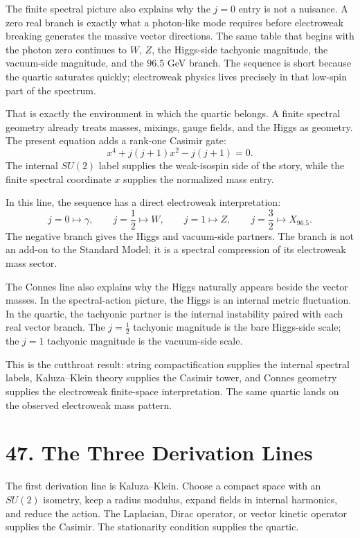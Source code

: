 \documentclass[11pt]{article}
\begin{document}
The finite spectral picture also explains why the \(j=0\) entry is not a nuisance. A zero real branch is exactly what a photon-like mode requires before electroweak breaking generates the massive vector directions. The same table that begins with the photon zero continues to \(W\), \(Z\), the Higgs-side tachyonic magnitude, the vacuum-side magnitude, and the \(96.5\) GeV branch. The sequence is short because the quartic saturates quickly; electroweak physics lives precisely in that low-spin part of the spectrum.

That is exactly the environment in which the quartic belongs. A finite spectral geometry already treats masses, mixings, gauge fields, and the Higgs as geometry. The present equation adds a rank-one Casimir gate:
\[
        x^4+j(j+1)x^2-j(j+1)=0.
\]
The internal \(SU(2)\) label supplies the weak-isospin side of the story, while the finite spectral coordinate \(x\) supplies the normalized mass entry.

In this line, the sequence has a direct electroweak interpretation:
\[
        j=0\mapsto \gamma,\qquad
        j=\frac12\mapsto W,\qquad
        j=1\mapsto Z,\qquad
        j=\frac32\mapsto X_{96.5}.
\]
The negative branch gives the Higgs and vacuum-side partners. The branch is not an add-on to the Standard Model; it is a spectral compression of its electroweak mass sector.

The Connes line also explains why the Higgs naturally appears beside the vector masses. In the spectral-action picture, the Higgs is an internal metric fluctuation. In the quartic, the tachyonic partner is the internal instability paired with each real vector branch. The \(j=\frac12\) tachyonic magnitude is the bare Higgs-side scale; the \(j=1\) tachyonic magnitude is the vacuum-side scale.

This is the cutthroat result: string compactification supplies the internal spectral labels, Kaluza--Klein theory supplies the Casimir tower, and Connes geometry supplies the electroweak finite-space interpretation. The same quartic lands on the observed electroweak mass pattern.


\section*{47. The Three Derivation Lines}

The first derivation line is Kaluza--Klein. Choose a compact space with an \(SU(2)\) isometry, keep a radius modulus, expand fields in internal harmonics, and reduce the action. The Laplacian, Dirac operator, or vector kinetic operator supplies the Casimir. The stationarity condition supplies the quartic.
\end{document}
